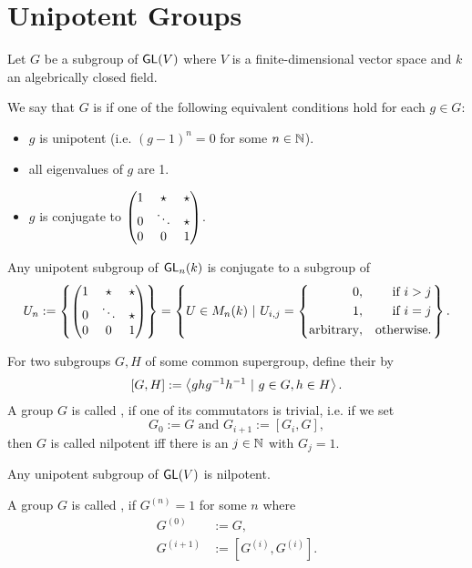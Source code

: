 \section{Unipotent Groups}
Let $G$ be a subgroup of $\textsf{GL}(V)$ where $V$ is a finite-dimensional vector space and $k$ an algebrically closed field.
\begin{definition}
We say that $G$ is  if one of the following equivalent conditions hold for each $g\in G$:
\begin{itemize}
	\item  $g $ is unipotent (i.e. $(g-1)^n = 0$ for some $n \in \mathbb{N}$).
	\item all eigenvalues of $g$ are 1.
	\item $g$ is conjugate to $\left(\begin{matrix} 1 & \star & \star\\ 0 & \ddots & \star \\ 0 & 0 & 1 \end{matrix}\right)$.
\end{itemize}
\end{definition}
\begin{theorem}
	Any unipotent subgroup of $\textsf{GL}_n(k)$ is conjugate to a subgroup of
	\[ U_n := \left\lbrace
	\left(\begin{matrix} 1 & \star & \star\\ 0 & \ddots & \star \\ 0 & 0 & 1 \end{matrix}\right)
	 \right\rbrace = \left\lbrace U\in M_n(k)  ~ | ~  U_{i,j} = \left\lbrace\begin{aligned}
		0, && \text{if } i > j\\
		1, &&\text{if } i = j\\
		\text{arbitrary}, && \text{otherwise}.
		\end{aligned} \right.\right\rbrace. \]
\end{theorem}
\begin{definition}
	For two subgroups $G,H$ of some common supergroup, define their  by
	\[ [G,H] := \left< ghg^{-1} h^{-1} ~|~ g \in G, h \in H \right>. \]
	A group $G$ is called , if one of its commutators is trivial, i.e. if we set
	\[ G_0 := G \text{  and  } G_{i+1} := [G_i, G], \]
	then $G$ is called nilpotent iff there is an $j\in \mathbb{N}$ with $G_j = 1$.
\end{definition}
\begin{corollary}
Any unipotent subgroup of $\textsf{GL}(V)$ is nilpotent.
\end{corollary}
\begin{definition}
A group $G$ is called , if $G^{(n)} = 1$ for some $n$ where
\begin{align*}
G^{(0)} &:= G,\\
G^{(i+1)} &:= [G^{(i)}, G^{(i)}].
\end{align*}
\end{definition}
